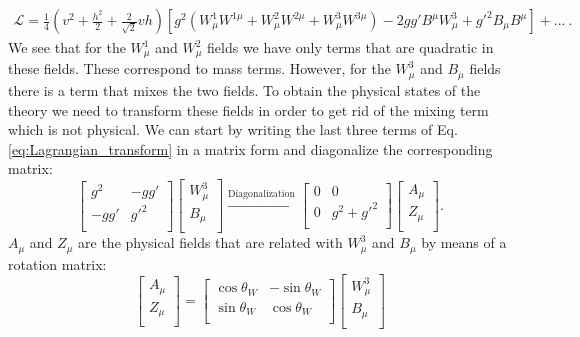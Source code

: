 \begin{align}
	\mathcal{L} = \frac{1}{4}\left(v^2+\frac{h^2}{2}+\frac{2}{\sqrt{2}}vh\right) \left[g^2\left(W^1_{\mu}W^{1\mu}+W^2_{\mu}W^{2\mu}+W^3_{\mu}W^{3\mu}\right)-2gg'B^{\mu}W^3_{\mu}+g'^2 B_{\mu}B^{\mu}\right] + ...~.
	\label{eq:Lagrangian_transform}
\end{align}
We see that for the $W^1_{\mu}$ and $W^2_{\mu}$ fields we have only terms that are quadratic in these fields. These correspond to mass terms. However, for the $W^3_{\mu}$ and $B_{\mu}$ fields there is a term that mixes the two fields. To obtain the physical states of the theory we need to transform these fields in order to get rid of the mixing term which is not physical. We can start by writing the last three terms of Eq. \ref{eq:Lagrangian_transform} in a matrix form and diagonalize the corresponding matrix:
\begin{equation}
\begin{bmatrix}
g^2 & -gg' \\
-gg' & g'^2 \\
\end{bmatrix}
\begin{bmatrix}
W^3_{\mu} \\
B_{\mu} \\
\end{bmatrix}
\xrightarrow{\text{Diagonalization}}
\begin{bmatrix}
0 & 0 \\
0 & g^2+g'^2 \\
\end{bmatrix}
\begin{bmatrix}
A_{\mu} \\
Z_{\mu} \\
\end{bmatrix}.
\label{eq:gauge_matrix}
\end{equation}
$A_{\mu}$ and $Z_{\mu}$ are the physical fields that are related with $W^3_{\mu}$ and $B_{\mu}$ by means of a rotation matrix:
\begin{equation}
\begin{bmatrix}
A_{\mu} \\
Z_{\mu} \\
\end{bmatrix}=
\begin{bmatrix}
\cos\theta_W & -\sin\theta_W \\
\sin\theta_W & \cos\theta_W \\
\end{bmatrix}
\begin{bmatrix}
W^3_{\mu} \\
B_{\mu} \\
\end{bmatrix}
\end{equation}
